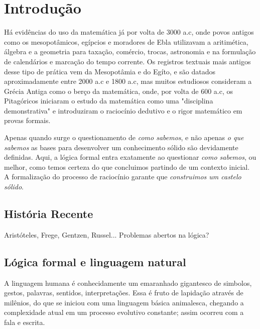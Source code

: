 \chapter{Introdução}

Há evidências do uso da matemática já por volta de 3000 a.c, onde povos antigos como os mesopotâmicos, egípcios e moradores de Ebla utilizavam a aritimética, álgebra e a geometria para taxação, comércio, trocas, astronomia e na formulação de calendários e marcação do tempo corrente.
Os registros textuais mais antigos desse tipo de prática vem da Mesopotâmia e do Egíto, e são datados aproximadamente entre 2000 a.c e 1800 a.c, mas muitos estudiosos consideram a Grécia Antiga como o berço da matemática, onde, por volta de 600 a.c, os Pitagóricos iniciaram o estudo da matemática como uma "disciplina demonstrativa" e introduziram o raciocínio dedutivo e o rigor matemático em provas formais.

Apenas quando surge o questionamento de \textit{como sabemos}, e não apenas \textit{o que sabemos} as bases para desenvolver um conhecimento sólido são devidamente definidas.
Aqui, a lógica formal entra exatamente ao questionar \textit{como sabemos}, ou melhor, como temos certeza do que concluimos partindo de um contexto inicial.
A formalização do processo de raciocínio garante que \textit{construimos um castelo sólido}.


\section{História Recente}
Aristóteles, Frege, Gentzen, Russel... Problemas abertos na lógica?

\section{Lógica formal e linguagem natural}
A linguagem humana é conhecidamente um emaranhado gigantesco de simbolos, gestos, palavras, sentidos, interpretações.
Essa é fruto de lapidação através de milênios, do que se iniciou com uma linguagem básica animalesca, chegando a complexidade atual em um processo evolutivo constante; assim ocorreu com a fala e escrita.

